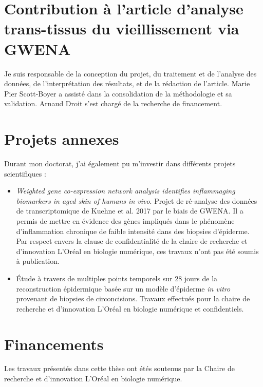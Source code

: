 \section{Contribution à l'article d'analyse trans-tissus du vieillissement via GWENA}

Je suis responsable de la conception du projet, du traitement et de l'analyse des données, de l'interprétation des résultats, et de la rédaction de l'article. Marie Pier Scott-Boyer a assisté dans la consolidation de la méthodologie et sa validation. Arnaud Droit s'est chargé de la recherche de financement.


\section{Projets annexes}

Durant mon doctorat, j'ai également pu m'investir dans différents projets scientifiques :
\begin{itemize}
    \item \textit{Weighted gene co-expression network analysis identifies inflammaging biomarkers in aged skin of humans in vivo}. Projet de ré-analyse des données de transcriptomique de Kuehne et al. 2017 par le biais de GWENA. Il a permis de mettre en évidence des gènes impliqués dans le phénomène d'inflammation chronique de faible intensité dans des biopsies d'épiderme. Par respect envers la clause de confidentialité de la chaire de recherche et d'innovation L'Oréal en biologie numérique, ces travaux n'ont pas été soumis à publication.
    \item Étude à travers de multiples points temporels sur 28 jours de la reconstruction épidermique basée sur un modèle d'épiderme \textit{in vitro} provenant de biopsies de circoncisions. Travaux effectués pour la chaire de recherche et d'innovation L'Oréal en biologie numérique et confidentiels.
\end{itemize}




\section{Financements}

Les travaux présentés dans cette thèse ont étés soutenus par la Chaire de recherche et d'innovation L'Oréal en biologie numérique.
